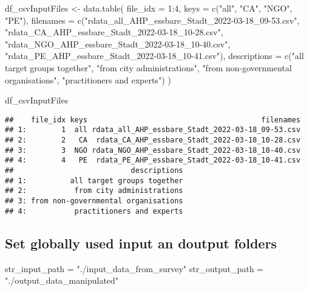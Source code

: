 \documentclass[
]{article}
\newenvironment{Shaded}{\begin{snugshade}}{\end{snugshade}}
\newcommand{\AttributeTok}[1]{\textcolor[rgb]{0.00,0.34,0.68}{#1}}
\newcommand{\DecValTok}[1]{\textcolor[rgb]{0.69,0.50,0.00}{#1}}
\newcommand{\FunctionTok}[1]{\textcolor[rgb]{0.39,0.29,0.61}{#1}}
\newcommand{\NormalTok}[1]{\textcolor[rgb]{0.12,0.11,0.11}{#1}}
\newcommand{\OtherTok}[1]{\textcolor[rgb]{0.00,0.43,0.16}{#1}}
\newcommand{\SpecialCharTok}[1]{\textcolor[rgb]{0.24,0.68,0.91}{#1}}
\newcommand{\StringTok}[1]{\textcolor[rgb]{0.75,0.01,0.01}{#1}}
\begin{document}
\begin{Shaded}
\begin{Highlighting}[]
\NormalTok{df\_csvInputFiles }\OtherTok{\textless{}{-}} \FunctionTok{data.table}\NormalTok{(}
  \AttributeTok{file\_idx =} \DecValTok{1}\SpecialCharTok{:}\DecValTok{4}\NormalTok{,}
  \AttributeTok{keys =} \FunctionTok{c}\NormalTok{(}\StringTok{"all"}\NormalTok{, }\StringTok{"CA"}\NormalTok{, }\StringTok{"NGO"}\NormalTok{, }\StringTok{"PE"}\NormalTok{),}
  \AttributeTok{filenames =} \FunctionTok{c}\NormalTok{(}\StringTok{"rdata\_all\_AHP\_essbare\_Stadt\_2022{-}03{-}18\_09{-}53.csv"}\NormalTok{,}
               \StringTok{"rdata\_CA\_AHP\_essbare\_Stadt\_2022{-}03{-}18\_10{-}28.csv"}\NormalTok{,}
               \StringTok{"rdata\_NGO\_AHP\_essbare\_Stadt\_2022{-}03{-}18\_10{-}40.csv"}\NormalTok{,}
               \StringTok{"rdata\_PE\_AHP\_essbare\_Stadt\_2022{-}03{-}18\_10{-}41.csv"}\NormalTok{),}
  \AttributeTok{descriptions =} \FunctionTok{c}\NormalTok{(}\StringTok{"all target groups together"}\NormalTok{,}
                   \StringTok{"from city administrations"}\NormalTok{,}
                   \StringTok{"from non{-}governmental organisations"}\NormalTok{,}
                   \StringTok{"practitioners and experts"}\NormalTok{)}
\NormalTok{)}

\NormalTok{df\_csvInputFiles}
\end{Highlighting}
\end{Shaded}

\begin{verbatim}
##    file_idx keys                                        filenames
## 1:        1  all rdata_all_AHP_essbare_Stadt_2022-03-18_09-53.csv
## 2:        2   CA  rdata_CA_AHP_essbare_Stadt_2022-03-18_10-28.csv
## 3:        3  NGO rdata_NGO_AHP_essbare_Stadt_2022-03-18_10-40.csv
## 4:        4   PE  rdata_PE_AHP_essbare_Stadt_2022-03-18_10-41.csv
##                           descriptions
## 1:          all target groups together
## 2:           from city administrations
## 3: from non-governmental organisations
## 4:           practitioners and experts
\end{verbatim}

\hypertarget{set-globally-used-input-an-doutput-folders}{%
\subsection{Set globally used input an doutput
folders}\label{set-globally-used-input-an-doutput-folders}}

\begin{Shaded}
\begin{Highlighting}[]
\NormalTok{str\_input\_path }\OtherTok{=} \StringTok{"./input\_data\_from\_survey"}
\NormalTok{str\_output\_path }\OtherTok{=} \StringTok{"./output\_data\_manipulated"}
\end{Highlighting}
\end{Shaded}
\end{document}
